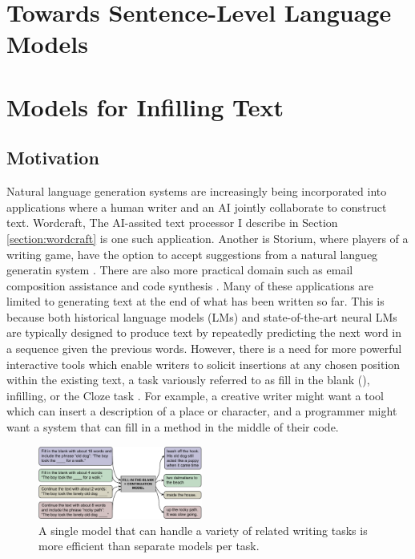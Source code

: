 \section{Towards Sentence-Level Language Models}



\section{Models for Infilling Text}
\label{section:fitb}

\subsection{Motivation}

Natural language generation systems are increasingly being incorporated into applications where a human writer and an AI jointly collaborate to construct text.
Wordcraft, The AI-assited text processor I describe in Section \ref{section:wordcraft} is one such application.
Another is Storium, where players of a writing game, have the option to accept suggestions from a natural langueg generatin system \citep{akoury2020storium}.
There are also more practical domain such as email composition assistance and code synthesis \citep{buschek2021impact,wu2018smart,austin2021program}.
Many of these applications are limited to generating text at the end of what has been written so far.
This is because
both historical language models (LMs) and state-of-the-art neural LMs
are typically designed to produce text by repeatedly predicting the next word in a sequence given the previous words.
However, there is a need for more powerful interactive tools which enable writers to solicit insertions at any chosen position within the existing text, a task variously referred to as fill in the blank (\FitB), infilling, or the Cloze task \citep{taylor1953cloze}.
For example, a creative writer might want a tool which can insert a description of a place or character, and a programmer might want a system that can fill in a method in the middle of their code.

\begin{figure}[t]
    \centering
    \includegraphics[width=0.48\textwidth]{figures/leading_figure.pdf}
    \caption{A single model that can handle a variety of related writing tasks is more efficient than separate models per task.}
    \label{fig:leading_figure}
    \vspace{-1em}
\end{figure}

